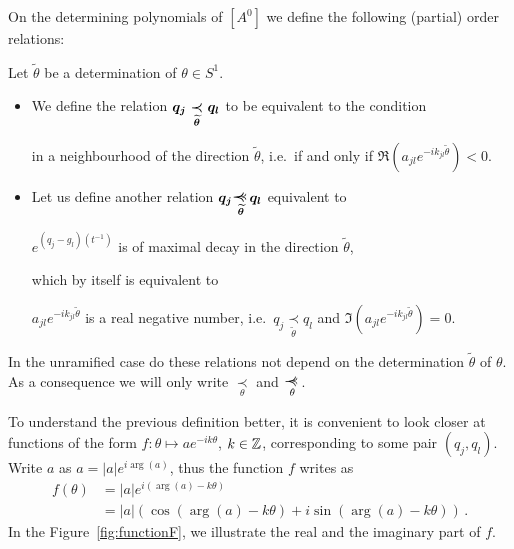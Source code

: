 On the determining polynomials of $[A^0]$ we define the following (partial)
order relations:
\begin{defn}\label{defn:definingRelations}
  Let $\tilde\theta$ be a determination of $\theta\in S^1$.
  \begin{itemize}
    \item We define the relation
      $\boldmath q_j \underset{\tilde\theta}{\prec} q_l$ to be equivalent to
      the condition
      \begin{einr}
         in a neighbourhood of
        the direction $\tilde\theta$, i.e.\ if and only if
        $\Re(a_{jl}e^{-ik_{jl}\tilde\theta})<0$.
      \end{einr}
    \item Let us define another relation $\boldmath q_j\myrel{\tilde\theta}q_l$
      equivalent to
      \begin{einr}
        $e^{(q_j-g_l)(t^{-1})}$ is of maximal decay in the direction
        $\tilde\theta$,
      \end{einr}
      which by itself is equivalent to
      \begin{einr}
        $a_{jl}e^{-ik_{jl}\tilde\theta}$ is a real negative
        number, i.e.\ $q_j \underset{\tilde\theta}{\prec} q_l$ and
        $\Im(a_{jl}e^{-ik_{jl}\tilde\theta})=0$.
      \end{einr}
  \end{itemize}
  \begin{s-rem}
    In the unramified case do these relations not depend on the determination
    $\tilde\theta$ of $\theta$. As a consequence we will only write
    $\underset{\theta}{\prec}$ and $\myrel{\theta}$.
  \end{s-rem}
\end{defn}
To understand the previous definition better, it is convenient to look closer at
functions of the form $f:\theta\mapsto ae^{-ik\theta}$, $k\in\Z$, corresponding
to some pair $(q_j,q_l)$.
Write $a$ as $a=|a|e^{i\arg(a)}$, thus the function $f$ writes as
\begin{align*}
  f(\theta)&=|a|e^{i(\arg(a)-k\theta)}
  \\&=|a|(\cos(\arg(a)-k\theta) + i\sin(\arg(a)-k\theta)) \,.
\end{align*}
In the Figure~\ref{fig:functionF}, we illustrate the real and the imaginary
part of $f$.
